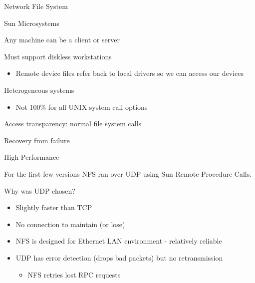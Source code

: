 \begin{slide}

	
	Network File System
	\bigskip
	
	Sun Microsystems

\end{slide}

\begin{slide}

	
	Any machine can be a client or server
	\medskip
	
	Must support diskless workstations
	\begin{itemize}
		\item Remote device files refer back to local drivers so we can access our devices
	\end{itemize}
	\medskip
	
	Heterogeneous systems
	\begin{itemize}
		\item Not 100\% for all UNIX system call options
	\end{itemize}
	\medskip
	
	Access transparency: normal file system calls
	\medskip
	
	Recovery from failure
	\medskip
	
	High Performance
	
\end{slide}

\begin{slide}

	
	For the first few versions NFS ran over UDP using Sun Remote Procedure Calls.
	\bigskip
	
	Why was UDP chosen?
	\begin{itemize}
		\item Slightly faster than TCP
		\item No connection to maintain (or lose)
		\item NFS is designed for Ethernet LAN environment - relatively reliable
		\item UDP has error detection (drops bad packets) but no retransmission
			\begin{itemize}
				\item NFS retries lost RPC requests
			\end{itemize}
	\end{itemize}
	
\end{slide}

